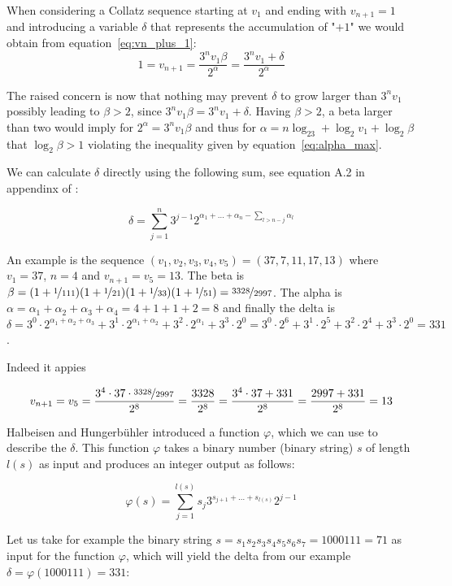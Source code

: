 \documentclass[12pt]{amsart}
\theoremstyle{definition}
\begin{document}
When considering a Collatz sequence starting at $v_1$ and ending with $v_{n+1}=1$ and introducing a variable $\delta$ that represents the accumulation of "$+1$" we would obtain from equation~\ref{eq:vn_plus_1}:
\[
1=v_{n+1}=\frac{3^nv_1\beta}{2^{\alpha}}=\frac{3^nv_1+\delta}{2^{\alpha}}
\]

\par\medskip
The raised concern is now that nothing may prevent $\delta$ to grow larger than $3^nv_1$ possibly leading to $\beta>2$, since ${3^nv_1 \beta}={3^nv_1+\delta}$. Having $\beta>2$, a beta larger than two  would imply for $2^{\alpha}=3^nv_1\beta$ and thus for $\alpha=n\log_23+\log_2v_1+\log_2\beta$ that $\log_2\beta>1$ violating the inequality given by equation~\ref{eq:alpha_max}.

We can calculate $\delta$ directly using the following sum, see equation A.2 in appendinx of \cite[p.~36]{Sultanow_Koch_2020}:

\begin{equation}
\label{eq:delta}
\delta=\sum_{j=1}^{n}3^{j-1}2^{\alpha_1+\ldots+\alpha_n-\sum_{l>n-j}\alpha_l}
\end{equation}

An example is the sequence $(v_1,v_2,v_3,v_4,v_5)=(37,7,11,17,13)$ where $v_1=37$, $n=4$ and $v_{n+1}=v_5=13$. The beta is $\beta=(1+\nicefrac{1}{111})(1+\nicefrac{1}{21})(1+\nicefrac{1}{33})(1+\nicefrac{1}{51})=\nicefrac{3328}{2997}$. The alpha is $\alpha=\alpha_1+\alpha_2+\alpha_3+\alpha_4=4+1+1+2=8$ and finally the delta is $\delta=3^0\cdot2^{\alpha_1+\alpha_2+\alpha_3}+3^1\cdot2^{\alpha_1+\alpha_2}+3^2\cdot2^{\alpha_1}+3^3\cdot2^0=3^0\cdot2^6+3^1\cdot2^5+3^2\cdot2^4+3^3\cdot2^0=331$.

\par\medskip
Indeed it appies

\[
v_{n+1}=v_5=\frac{3^4\cdot37\cdot\nicefrac{3328}{2997}}{2^8}=\frac{3328}{2^8}=\frac{3^4\cdot37+331}{2^8}=\frac{2997+331}{2^8}=13
\]

Halbeisen and Hungerbühler \cite{Halbeisen_Hungerbuehler_1997} introduced a function $\varphi$, which we can use to describe the $\delta$. This function $\varphi$ takes a binary number (binary string) $s$ of length $l(s)$ as input and produces an integer output as follows:

\begin{equation}
\label{eq:phi}
\varphi(s)=\sum_{j=1}^{l(s)}s_j3^{s_{j+1}+\ldots+s_{l(s)}}2^{j-1}
\end{equation}

\noindent
Let us take for example the binary string $s=s_1s_2s_3s_4s_5s_6s_7=1000111=71$ as input for the function $\varphi$, which will yield the delta from our example $\delta=\varphi(1000111)=331$:
\end{document}
